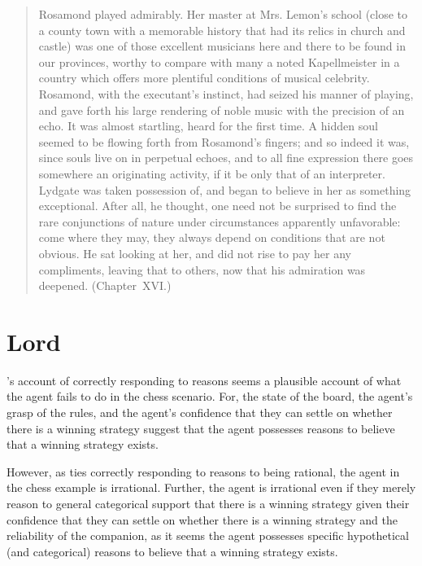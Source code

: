 \documentclass[10pt]{article}
\begin{document}
\begin{quote}
  Rosamond played admirably.
  Her master at Mrs. Lemon's school (close to a county town with a memorable history that had its relics in church and castle) was one of those excellent musicians here and there to be found in our provinces, worthy to compare with many a noted Kapellmeister in a country which offers more plentiful conditions of musical celebrity.
  Rosamond, with the executant's instinct, had seized his manner of playing, and gave forth his large rendering of noble music with the precision of an echo.
  It was almost startling, heard for the first time.
  A hidden soul seemed to be flowing forth from Rosamond's fingers; and so indeed it was, since souls live on in perpetual echoes, and to all fine expression there goes somewhere an originating activity, if it be only that of an interpreter.
  Lydgate was taken possession of, and began to believe in her as something exceptional.
  After all, he thought, one need not be surprised to find the rare conjunctions of nature under circumstances apparently
  unfavorable: come where they may, they always depend on conditions that are not obvious.
  He sat looking at her, and did not rise to pay her any compliments, leaving that to others, now that his admiration was deepened.\nolinebreak
  \mbox{}\hfill\mbox{(Chapter XVI.)}
\end{quote}

\newpage

\section{Lord}
\label{sec:lord}

\begin{note}
  \citeauthor{Lord:2018aa}'s account of correctly responding to reasons seems a plausible account of what the agent fails to do in the chess scenario.
  For, the state of the board, the agent's grasp of the rules, and the agent's confidence that they can settle on whether there is a winning strategy suggest that the agent possesses reasons to believe that a winning strategy exists.

  However, as \citeauthor{Lord:2018aa} ties correctly responding to reasons to being rational, the agent in the chess example is irrational.
  Further, the agent is irrational even if they merely reason to general categorical support that there is a winning strategy given their confidence that they can settle on whether there is a winning strategy and the reliability of the companion, as it seems the agent possesses specific hypothetical (and categorical) reasons to believe that a winning strategy exists.
\end{note}
\end{document}
